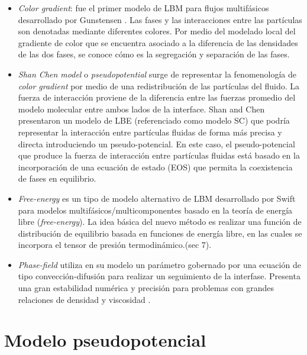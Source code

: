 \begin{itemize}
	
	\item \textit{Color gradient}: fue el primer modelo de LBM para flujos multifásicos desarrollado por Gunstensen \cite{gunstensen1991lattice}. Las fases y las interacciones entre las partículas son denotadas mediante diferentes colores. Por medio del modelado local del gradiente de color que se encuentra asociado a la diferencia de las densidades de las dos fases, se conoce cómo es la segregación y separación de las fases.
	
	\newpage
	\item \textit{Shan Chen model} o \textit{pseudopotential} surge de representar la fenomenología de \textit{color gradient} por medio de una redistribución de las partículas del fluido. La fuerza de interacción proviene de la diferencia entre las fuerzas promedio del modelo molecular  entre ambos lados de la interface. Shan and Chen \cite{shan1993lattice} presentaron un modelo de LBE (referenciado como modelo SC) que podría representar la interacción entre partículas fluidas de forma más precisa y directa introduciendo un pseudo-potencial. En este caso, el pseudo-potencial que produce la fuerza de interacción entre partículas fluidas está basado en la incorporación de una ecuación de estado (EOS) que permita la coexistencia de fases en equilibrio.
	
	\item \textit{Free-energy} es un tipo de modelo alternativo de LBM desarrollado por Swift \cite{swift1995lattice} para modelos multifásicos/multicomponentes basado en la teoría de energía libre (\textit{free-energy}). La idea básica del nuevo método es realizar una función de distribución de equilibrio basada en funciones de energía libre, en las cuales se incorpora el tensor de presión termodinámico.\cite{guo2013lattice}(sec 7).
	
	\item \textit{Phase-field} utiliza en su modelo un parámetro gobernado por una ecuación de tipo convección-difusión para realizar un seguimiento de la interfase. Presenta una gran estabilidad numérica y precisión para problemas con grandes relaciones de densidad y viscosidad \cite{wang2019brief}.
	
	
\end{itemize}





\section{Modelo pseudopotencial}

